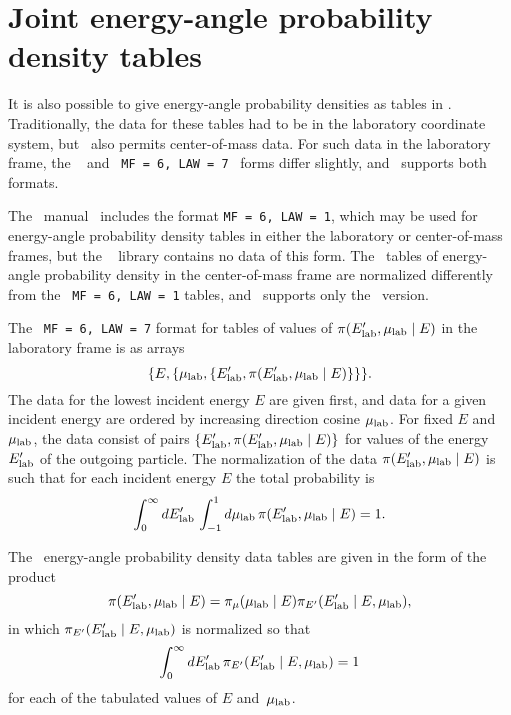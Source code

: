 \chapter{Joint energy-angle probability density tables}
\label{Sec:joint-table}
It is also possible to give energy-angle probability densities
as tables in \xendl.  Traditionally, the data for these tables 
had to be in the laboratory coordinate system, but \xendl\ also
permits center-of-mass data.  For such data in the laboratory frame,
the \ENDL~\cite{Omega} and \ENDF\ 
\texttt{MF = 6, LAW = 7}~\cite{ENDFB} forms 
differ slightly, and \gettransfer\ supports both formats.

The \ENDF\ manual~\cite{ENDFB} includes the format 
\texttt{MF = 6, LAW = 1}, which
may be used for energy-angle probability density tables in either
the laboratory or center-of-mass frames, but the
\ENDFdata~\cite{ENDFdata} library contains no data of this form.
The \xendl\ tables of energy-angle probability density in the
center-of-mass frame are normalized differently from the
\ENDF\  \texttt{MF = 6, LAW = 1} tables, and \gettransfer\ supports only the
\xendl\ version.

The \ENDF\ \texttt{MF = 6, LAW = 7} format for tables
of values of $\pi(E_{\text{lab}}', \mu_{\text{lab}} \mid E)$ in the laboratory frame is as arrays
\begin{equation}
  \{ E, \{ \mu_{\text{lab}}, \{ E_{\text{lab}}', \pi(E_{\text{lab}}', \mu_{\text{lab}} \mid E) \} \} \}.
 \label{ENDF-E-mu-table}
\end{equation}
The data for the lowest incident energy $E$ are given first,
and data for a given incident energy are ordered by increasing direction cosine $\mu_{\text{lab}}$.
For fixed $E$ and $\mu_{\text{lab}}$, the data consist of pairs $\{ E_{\text{lab}}', \pi(E_{\text{lab}}', \mu_{\text{lab}} \mid E) \}$
for values of the energy $E_{\text{lab}}'$ of the outgoing particle.
The normalization of the data $\pi(E_{\text{lab}}', \mu_{\text{lab}} \mid E)$ is such that 
for each incident energy $E$
the total probability is
$$
  \int_0^\infty dE_{\text{lab}}' \, \int_{-1}^1 d\mu_{\text{lab}} \, \pi(E_{\text{lab}}', \mu_{\text{lab}} \mid E) = 1.
$$

The \ENDL\ energy-angle probability density data tables
are given in the form of the product
\begin{equation}
  \pi(E_{\text{lab}}', \mu_{\text{lab}} \mid E) =
  \pi_\mu(\mu_{\text{lab}} \mid E)\pi_{E'}(E_{\text{lab}}' \mid E, \mu_{\text{lab}}),
   \label{correlated}
\end{equation}
in which $\pi_{E'}(E_{\text{lab}}' \mid E, \mu_{\text{lab}})$ is normalized so that
$$
  \int_0^\infty dE_{\text{lab}}' \, \pi_{E'}(E_{\text{lab}}' \mid E, \mu_{\text{lab}}) = 1
$$
for each of the tabulated values of $E$ and~$\mu_{\text{lab}}$.

